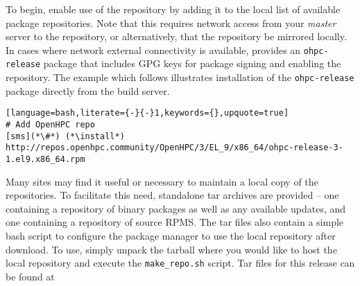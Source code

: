 To begin, enable use of the \OHPC{} repository by adding it to the local list
of available package repositories. Note that this requires network access from
your {\em master} server to the \OHPC{} repository, or alternatively, that
the \OHPC{} repository be mirrored locally.  In cases where network external
connectivity is available, \OHPC{} provides an \texttt{ohpc-release} package
that includes GPG keys for package signing and enabling the repository.  The
example which follows illustrates installation of the \texttt{ohpc-release}
package directly from the \OHPC{} build server.

\begin{lstlisting}[language=bash,literate={-}{-}1,keywords={},upquote=true]
# Add OpenHPC repo 
[sms](*\#*) (*\install*) http://repos.openhpc.community/OpenHPC/3/EL_9/x86_64/ohpc-release-3-1.el9.x86_64.rpm
\end{lstlisting}

\begin{center}
\begin{tcolorbox}[]
\small Many sites may find it useful or necessary to maintain a local copy of the
\OHPC{} repositories. To facilitate this need, standalone tar
archives are provided -- one containing a repository of binary packages as well as any
available updates, and one containing a repository of source RPMS. The tar files
also contain a simple bash script to configure the package manager to use the
local repository after download. To use, simply unpack the tarball where you
would like to host the local repository and execute the \texttt{make\_repo.sh} script.
Tar files for this release can be found at \href{http://repos.openhpc.community/dist/\OHPCVersion}
        {\color{blue}{http://repos.openhpc.community/dist/\OHPCVersion}}
\end{tcolorbox}
\end{center}
